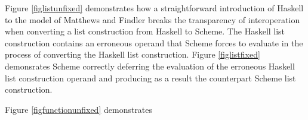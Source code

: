 Figure \ref{figlistunfixed} demonstrates how a straightforward introduction of Haskell to the model of Matthews and Findler breaks the transparency of interoperation when converting a list construction from Haskell to Scheme. The Haskell list construction contains an erroneous operand that Scheme forces to evaluate in the process of converting the Haskell list construction. Figure \ref{figlistfixed} demonsrates Scheme correctly deferring the evaluation of the erroneous Haskell list construction operand and producing as a result the counterpart Scheme list construction.

Figure \ref{figfunctionunfixed} demonstrates 







